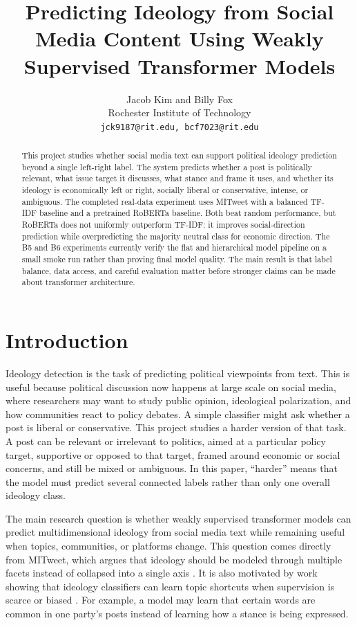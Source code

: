 \documentclass[11pt,twocolumn]{article}
\title{Predicting Ideology from Social Media Content Using Weakly Supervised Transformer Models}
\author{Jacob Kim and Billy Fox \\
  Rochester Institute of Technology \\
  \texttt{jck9187@rit.edu, bcf7023@rit.edu}}
\date{}
\begin{document}
\maketitle

\begin{abstract}
This project studies whether social media text can support political ideology prediction beyond a single left-right label. The system predicts whether a post is politically relevant, what issue target it discusses, what stance and frame it uses, and whether its ideology is economically left or right, socially liberal or conservative, intense, or ambiguous. The completed real-data experiment uses MITweet with a balanced TF-IDF baseline and a pretrained RoBERTa baseline. Both beat random performance, but RoBERTa does not uniformly outperform TF-IDF: it improves social-direction prediction while overpredicting the majority neutral class for economic direction. The B5 and B6 experiments currently verify the flat and hierarchical model pipeline on a small smoke run rather than proving final model quality. The main result is that label balance, data access, and careful evaluation matter before stronger claims can be made about transformer architecture.
\end{abstract}

\section{Introduction}

Ideology detection is the task of predicting political viewpoints from text. This is useful because political discussion now happens at large scale on social media, where researchers may want to study public opinion, ideological polarization, and how communities react to policy debates. A simple classifier might ask whether a post is liberal or conservative. This project studies a harder version of that task. A post can be relevant or irrelevant to politics, aimed at a particular policy target, supportive or opposed to that target, framed around economic or social concerns, and still be mixed or ambiguous. In this paper, ``harder'' means that the model must predict several connected labels rather than only one overall ideology class.

The main research question is whether weakly supervised transformer models can predict multidimensional ideology from social media text while remaining useful when topics, communities, or platforms change. This question comes directly from MITweet, which argues that ideology should be modeled through multiple facets instead of collapsed into a single axis \cite{liu-etal-2023-ideology}. It is also motivated by work showing that ideology classifiers can learn topic shortcuts when supervision is scarce or biased \cite{chen-etal-2023-ideology}. For example, a model may learn that certain words are common in one party's posts instead of learning how a stance is being expressed.
\end{document}
